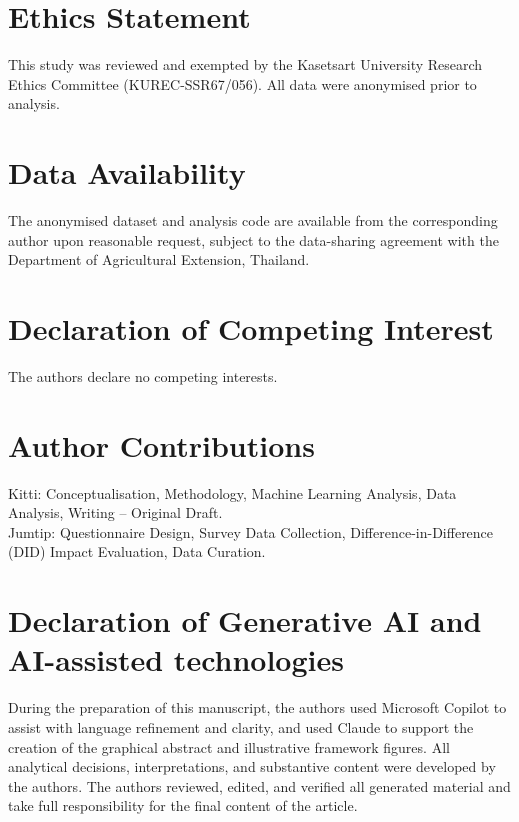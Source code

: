 \documentclass[3p,twocolumn,authoryear]{elsarticle}
\begin{document}
\section*{Ethics Statement}
This study was reviewed and exempted by the Kasetsart University Research Ethics
Committee (KUREC-SSR67/056). All data were anonymised prior to analysis.

\section*{Data Availability}
The anonymised dataset and analysis code are available from the corresponding
author upon reasonable request, subject to the data-sharing agreement with the
Department of Agricultural Extension, Thailand.

\section*{Declaration of Competing Interest}
The authors declare no competing interests.

\section*{Author Contributions}
Kitti: Conceptualisation, Methodology, Machine Learning Analysis, Data Analysis,
Writing -- Original Draft.\\
Jumtip: Questionnaire Design, Survey Data Collection, Difference-in-Difference
(DID) Impact Evaluation, Data Curation.

\section*{Declaration of Generative AI and AI-assisted technologies}
During the preparation of this manuscript, the authors used Microsoft Copilot to
assist with language refinement and clarity, and used Claude to support the
creation of the graphical abstract and illustrative framework figures. All
analytical decisions, interpretations, and substantive content were developed by
the authors. The authors reviewed, edited, and verified all generated material
and take full responsibility for the final content of the article.
\end{document}
